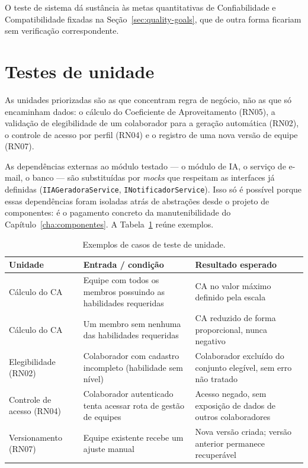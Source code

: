 \documentclass[a4paper,12pt,oneside,openany]{book}
\newif\iforientacoes
\newcommand{\orientacao}[1]{%
    \iforientacoes
        \begin{quote}
        \small\itshape\textbf{Orientação:} #1
        \end{quote}
    \fi
}
\begin{document}
O teste de sistema dá sustância às metas quantitativas de Confiabilidade e
Compatibilidade fixadas na Seção~\ref{sec:quality-goals}, que de outra forma
ficariam sem verificação correspondente.

\section{Testes de unidade}

\orientacao{Selecionem unidades relevantes e definam cenários e casos de
teste. Quando existirem dependências externas ou difíceis de controlar,
expliquem se serão utilizados \textit{stubs}, \textit{mocks} ou outras formas
de substituição. Apresentem exemplos representativos contendo entradas,
condições e resultados esperados.}

As unidades priorizadas são as que concentram regra de negócio, não as que só
encaminham dados: o cálculo do Coeficiente de Aproveitamento (RN05), a
validação de elegibilidade de um colaborador para a geração automática (RN02),
o controle de acesso por perfil (RN04) e o registro de uma nova versão de
equipe (RN07).

As dependências externas ao módulo testado --- o módulo de IA, o serviço de
e-mail, o banco --- são substituídas por \textit{mocks} que respeitam as
interfaces já definidas (\texttt{IIAGeradoraService},
\texttt{INotificadorService}). Isso só é possível porque essas dependências
foram isoladas atrás de abstrações desde o projeto de componentes: é o
pagamento concreto da manutenibilidade do Capítulo~\ref{cha:componentes}. A
Tabela~\ref{tab:testes-unidade} reúne exemplos.

\begin{table}[H]
\centering
\caption{Exemplos de casos de teste de unidade.}
\label{tab:testes-unidade}
\begin{tabularx}{0.95\textwidth}{p{} p{} X}
\toprule
\textbf{Unidade} & \textbf{Entrada / condição} & \textbf{Resultado esperado} \\
\midrule
Cálculo do CA & Equipe com todos os membros possuindo as habilidades
requeridas & CA no valor máximo definido pela escala \\
Cálculo do CA & Um membro sem nenhuma das habilidades requeridas &
CA reduzido de forma proporcional, nunca negativo \\
Elegibilidade (RN02) & Colaborador com cadastro incompleto (habilidade sem
nível) & Colaborador excluído do conjunto elegível, sem erro não tratado \\
Controle de acesso (RN04) & Colaborador autenticado tenta acessar rota de
gestão de equipes & Acesso negado, sem exposição de dados de outros
colaboradores \\
Versionamento (RN07) & Equipe existente recebe um ajuste manual & Nova versão
criada; versão anterior permanece recuperável \\
\bottomrule
\end{tabularx}
\end{table}
\end{document}
